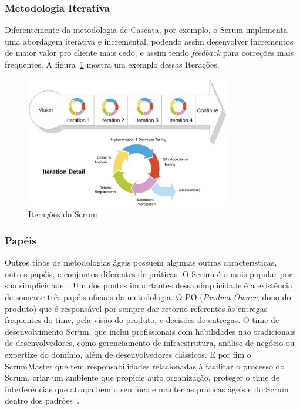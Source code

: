 \subsubsection{Metodologia Iterativa}

Diferentemente da metodologia de Cascata, por exemplo, o Scrum implementa uma
abordagem iterativa e incremental, podendo assim desenvolver incrementos de
maior valor pro cliente mais cedo, e assim tendo \textit{feedback} para correções
mais frequentes. A figura~\ref{fig:iterative} mostra um exemplo dessas
Iterações.~\cite{scrumreference:2016}

\begin{figure}[H]
  \centering
  \includegraphics[width=0.8\textwidth]{figuras/iterative.eps}
  \caption{Iterações do Scrum}
  \label{fig:iterative}
\end{figure}

\subsubsection{Papéis}

Outros tipos de metodologias ágeis possuem algumas outras características, outros
papéis, e conjuntos diferentes de práticas. O Scrum é o mais popular por sua
simplicidade~\cite{ilieva2004analyses}. Um dos pontos importantes dessa
simplicidade é a existência de somente três papéis oficiais da metodologia. O 
PO (\textit{Product Owner}, dono do produto) que é responsável por sempre dar
retorno referentes às entregas frequentes do time, pela visão do produto,
e decisões de entregas. O time de desenvolvimento Scrum, que inclui profissionais
com habilidades não tradicionais de desenvolvedores, como gerenciamento de
infraestrutura, análise de negócio ou expertize do domínio, além de
desenvolvedores clássicos. E por fim o ScrumMaster que tem responsabilidades
relacionadas à facilitar o processo do Scrum, criar um ambiente que propicie
auto organização, proteger o time de interferências que atrapalhem o seu foco e
manter as práticas ágeis e do Scrum dentro dos
padrões~\cite{scrumreference:2016}.


